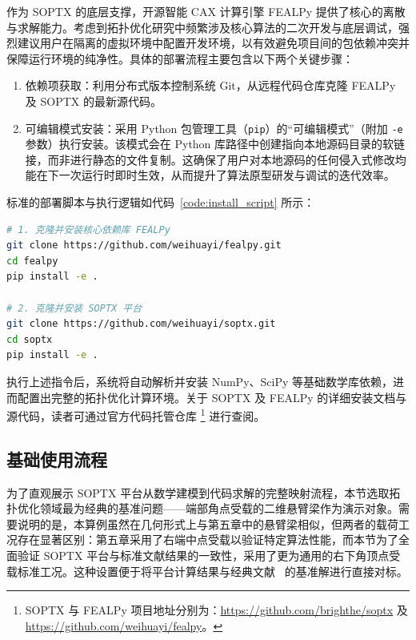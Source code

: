 作为 SOPTX 的底层支撑，开源智能 CAX 计算引擎 FEALPy 提供了核心的离散与求解能力。考虑到拓扑优化研究中频繁涉及核心算法的二次开发与底层调试，强烈建议用户在隔离的虚拟环境中配置开发环境，以有效避免项目间的包依赖冲突并保障运行环境的纯净性。具体的部署流程主要包含以下两个关键步骤：
\begin{enumerate}
	\item 依赖项获取：利用分布式版本控制系统 Git，从远程代码仓库克隆 FEALPy 及 SOPTX 的最新源代码。
	
	\item 可编辑模式安装：采用 Python 包管理工具（\texttt{pip}）的“可编辑模式”（附加 \texttt{-e} 参数）执行安装。该模式会在 Python 库路径中创建指向本地源码目录的软链接，而非进行静态的文件复制。这确保了用户对本地源码的任何侵入式修改均能在下一次运行时即时生效，从而提升了算法原型研发与调试的迭代效率。
\end{enumerate}
标准的部署脚本与执行逻辑如代码~\ref{code:install_script} 所示：
\begin{lstlisting}[language=bash, 
	caption={SOPTX 及 FEALPy 源码安装脚本}, 
	label={code:install_script},
	float=htbp]
# 1. 克隆并安装核心依赖库 FEALPy
git clone https://github.com/weihuayi/fealpy.git
cd fealpy
pip install -e .

# 2. 克隆并安装 SOPTX 平台
git clone https://github.com/weihuayi/soptx.git
cd soptx
pip install -e .
\end{lstlisting}

执行上述指令后，系统将自动解析并安装 NumPy、SciPy 等基础数学库依赖，进而配置出完整的拓扑优化计算环境。关于 SOPTX 及 FEALPy 的详细安装文档与源代码，读者可通过官方代码托管仓库 \footnote{SOPTX 与 FEALPy 项目地址分别为：\url{https://github.com/brighthe/soptx} 及 \url{https://github.com/weihuayi/fealpy}。} 进行查阅。


\subsection{基础使用流程}
\label{subsec:soptx_basic_workflow}

为了直观展示 SOPTX 平台从数学建模到代码求解的完整映射流程，本节选取拓扑优化领域最为经典的基准问题——端部角点受载的二维悬臂梁作为演示对象。需要说明的是，本算例虽然在几何形式上与第五章中的悬臂梁相似，但两者的载荷工况存在显著区别：第五章采用了右端中点受载以验证特定算法性能，而本节为了全面验证 SOPTX 平台与标准文献结果的一致性，采用了更为通用的右下角顶点受载标准工况。这种设置便于将平台计算结果与经典文献~\cite{bendsoeTopologyOptimization2004a} 的基准解进行直接对标。


